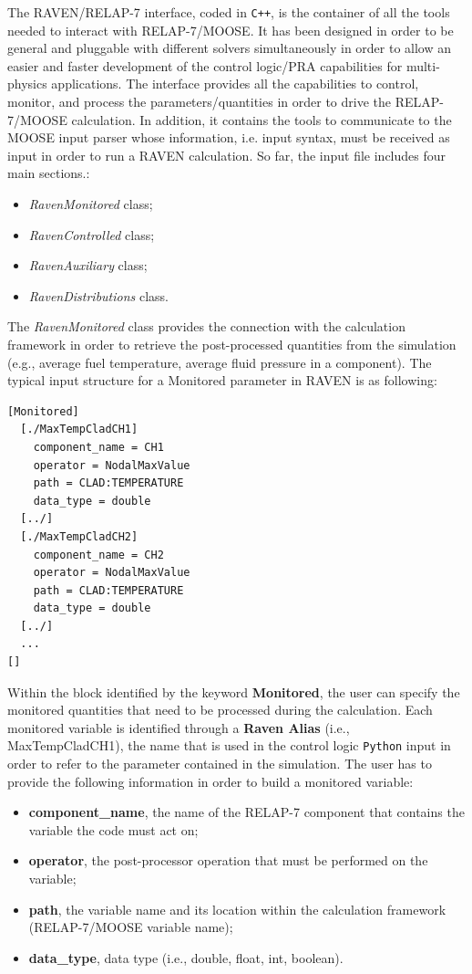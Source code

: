 \documentclass{mc2013}
\begin{document}
\label{sec:interface}
The RAVEN/RELAP-7 interface, coded in \verb!C++!, is the container of all the tools needed to interact with RELAP-7/MOOSE. It has been designed in order to be general and pluggable with different solvers simultaneously in order to allow an easier and faster development of the control logic/PRA capabilities for multi-physics applications.
The interface provides all the capabilities to control, monitor, and process the parameters/quantities in order to drive the RELAP-7/MOOSE calculation. In addition, it contains the tools to communicate to the MOOSE input parser whose information, i.e. input syntax, must be received as input in order to run a RAVEN  calculation. So far, the input file includes four main sections.:
\begin{itemize}
\item \emph{RavenMonitored} class;
\item \emph{RavenControlled} class;
\item \emph{RavenAuxiliary} class;
\item \emph{RavenDistributions} class.
\end{itemize}
The \emph{RavenMonitored} class provides the connection with the calculation framework in order to retrieve the post-processed quantities from the simulation (e.g., average fuel temperature, average fluid pressure in a component). The typical input structure for a Monitored parameter in RAVEN is as following:
\begin{lstlisting}
[Monitored]
  [./MaxTempCladCH1]
    component_name = CH1
    operator = NodalMaxValue
    path = CLAD:TEMPERATURE
    data_type = double
  [../]
  [./MaxTempCladCH2]
    component_name = CH2
    operator = NodalMaxValue
    path = CLAD:TEMPERATURE
    data_type = double
  [../]
  ...
[]
\end{lstlisting}
Within the block identified by the keyword \textbf{Monitored}, the user can specify the monitored quantities that need to be processed during the calculation. Each monitored variable is identified through a \textbf{Raven Alias} (i.e., MaxTempCladCH1), the name that is used in the control logic \verb!Python! input in order to refer to the parameter contained in the simulation.
The user has to provide the following information in order to build a monitored variable:
\begin{itemize}
  \item \textbf{component\_name}, the name of the RELAP-7 component that contains the variable the code must act on;
  \item \textbf{operator}, the post-processor operation that must be performed on the variable;
  \item \textbf{path}, the variable name and its location within the calculation framework (RELAP-7/MOOSE variable name);
  \item \textbf{data\_type}, data type (i.e., double, float, int, boolean).
\end{itemize}
\end{document}
